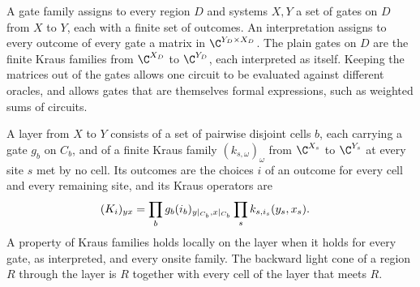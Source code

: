 \begin{definition}
    \label{def:circuits_gate_family}
    \leanok
    A gate family assigns to every region $D$ and systems $X,Y$ a set of gates on
    $D$ from $X$ to $Y$, each with a finite set of outcomes. An interpretation
    assigns to every outcome of every gate a matrix in
    $\C^{Y_D\times X_D}$. The plain gates on $D$ are the finite Kraus families
    from $\C^{X_D}$ to $\C^{Y_D}$, each interpreted as itself. Keeping the
    matrices out of the gates allows one circuit to be evaluated against
    different oracles, and allows gates that are themselves formal expressions,
    such as weighted sums of circuits.
\end{definition}

\begin{definition}[Layer]
    \label{def:circuits_layer}
    \leanok
    A layer from $X$ to $Y$ consists of a set of pairwise disjoint cells $b$, each
    carrying a gate $g_b$ on $C_b$, and of a finite Kraus family
    $(k_{s,\omega})_\omega$ from $\C^{X_s}$ to $\C^{Y_s}$ at every site $s$ met by
    no cell. Its outcomes are the choices $i$ of an outcome for every cell and
    every remaining site, and its Kraus operators are
    \begin{align}
        (K_i)_{yx}&=\prod_b g_b(i_b)_{y|_{C_b},x|_{C_b}}\prod_sk_{s,i_s}(y_s,x_s).
        \notag
    \end{align}
    A property of Kraus families holds locally on the layer when it holds for
    every gate, as interpreted, and every onsite family. The backward light cone
    of a region $R$ through the layer is $R$ together with every cell of the layer
    that meets $R$.
\end{definition}

